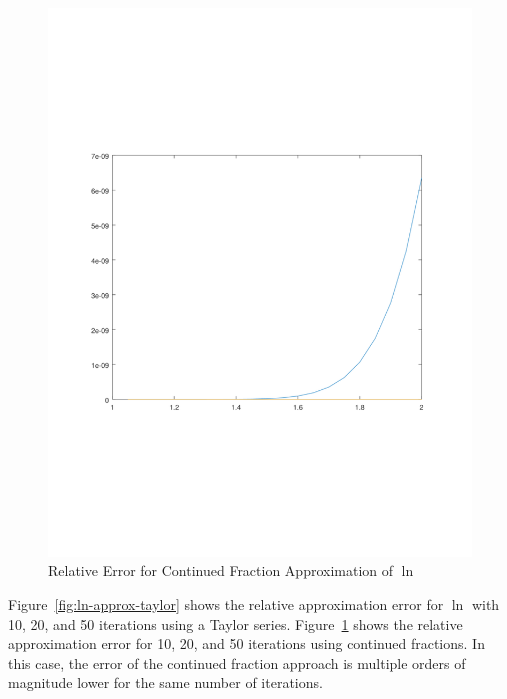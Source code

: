 \documentclass[11pt,a4paper,dvipsnames,twosided]{article}
\theoremstyle{definition}
\theoremstyle{definition}
\begin{document}
\begin{figure}[ht]
  \centering
    \includegraphics[width=\textwidth]{ln_cf}
  \caption{Relative Error for Continued Fraction Approximation of  $\ln$}
  \label{fig:ln-approx-cf}
\end{figure}

Figure~\ref{fig:ln-approx-taylor} shows the relative approximation error for
$\ln$ with 10, 20, and 50 iterations using a Taylor
series. Figure~\ref{fig:ln-approx-cf} shows the relative approximation error for
10, 20, and 50 iterations using continued fractions. In this case, the error of
the continued fraction approach is multiple orders of magnitude lower for the
same number of iterations.
\end{document}

